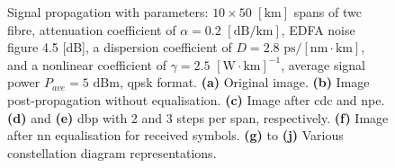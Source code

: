 \begin{landscape}
\begin{figure}[htpb]
\begin{minipage}[h]{0.45\linewidth}
\begin{minipage}[h]{0.49\linewidth}
{        }
        \end{minipage}
    \end{minipage}
    \caption{Signal propagation with parameters: $10 \times 50$ $[\textrm{km}]$ spans of \gls{twc} fibre, attenuation coefficient of $\alpha = 0.2$ $[\textrm{dB}/\textrm{km}]$, EDFA noise figure 4.5 \textrm{[dB]}, a dispersion coefficient of $D = 2.8$ $\textrm{ps}/[\textrm{nm} \cdot \textrm{km}]$, and a nonlinear coefficient of $\gamma = 2.5$ $[\textrm{W} \cdot \textrm{km}]^{-1}$, average signal power $P_{ave} = 5$ $\textrm{dBm}$, \gls{qpsk} format. \textbf{(a)} Original image. \textbf{(b)} Image post-propagation without equalisation. \textbf{(c)} Image after \gls{cdc} and \gls{npe}. \textbf{(d)} and \textbf{(e)} \gls{dbp} with 2 and 3 steps per span, respectively. \textbf{(f)} Image after \gls{nn} equalisation for received symbols. \textbf{(g)} to \textbf{(j)} Various constellation diagram representations.}
    \label{fig:demo_twc}
\end{figure}
\end{landscape}

